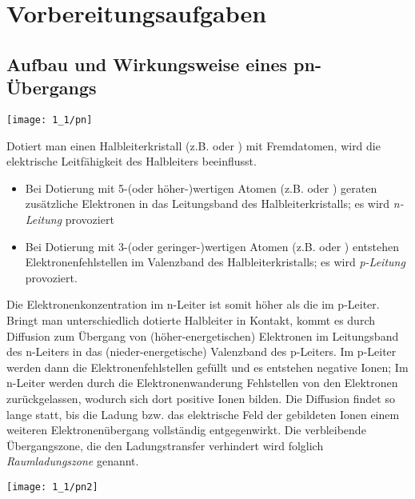 \documentclass[a4paper, 12pt]{article}
\begin{document}
  
  \clearpage
  \setcounter{page}{1}

\section{Vorbereitungsaufgaben}

\subsection{Aufbau und Wirkungsweise eines pn-Übergangs}
\begin{center}
  \texttt{[image: 1\_1/pn]}
\end{center}

\noindent Dotiert man einen Halbleiterkristall (z.B.  oder ) mit
Fremdatomen, wird die elektrische Leitfähigkeit des Halbleiters beeinflusst.

\begin{itemize}
\item{
    Bei Dotierung mit
    5-(oder höher-)wertigen Atomen (z.B.  oder ) geraten zusätzliche
    Elektronen in das Leitungsband des Halbleiterkristalls; es wird \emph{n-Leitung}
    provoziert
  }

\item{
    Bei Dotierung mit
    3-(oder geringer-)wertigen Atomen (z.B.  oder ) entstehen
    Elektronenfehlstellen im Valenzband des Halbleiterkristalls; es wird \emph{p-Leitung}
    provoziert.
  }
\end{itemize}

Die Elektronenkonzentration im n-Leiter ist somit höher als die im p-Leiter.
Bringt man unterschiedlich dotierte Halbleiter in Kontakt, kommt es durch
Diffusion zum Übergang von (höher-energetischen) Elektronen im Leitungsband des
n-Leiters in das (nieder-energetische) Valenzband des p-Leiters. Im p-Leiter
werden dann die Elektronenfehlstellen gefüllt und es entstehen negative Ionen;
Im n-Leiter werden durch die Elektronenwanderung Fehlstellen
von den Elektronen zurückgelassen, wodurch sich dort positive Ionen bilden. Die
Diffusion findet so lange statt, bis die Ladung bzw. das elektrische Feld der gebildeten Ionen einem weiteren
Elektronenübergang vollständig entgegenwirkt. Die verbleibende Übergangszone,
die den Ladungstransfer verhindert
wird folglich \emph{Raumladungszone} genannt. 

\begin{center}
  \texttt{[image: 1\_1/pn2]}
\end{center}
\end{document}
